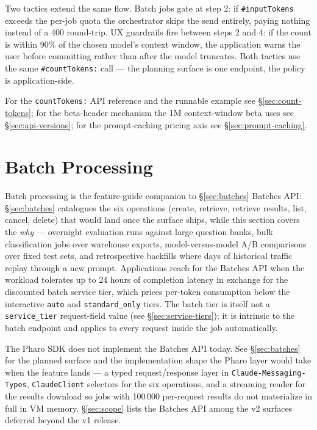\documentclass[a4paper,10pt,fleqn]{article}
\newcommand{\sel}[1]{\texttt{\##1}}
\begin{document}
Two tactics extend the same flow.  Batch jobs gate at step 2: if
\sel{inputTokens} exceeds the per-job quota the orchestrator skips
the send entirely, paying nothing instead of a 400 round-trip.  UX
guardrails fire between steps 2 and 4: if the count is within 90\%
of the chosen model's context window, the application warns the
user before committing rather than after the model truncates.  Both
tactics use the same \sel{countTokens:} call --- the planning surface
is one endpoint, the policy is application-side.

For the \texttt{countTokens:} API reference and the runnable
example see §\ref{sec:count-tokens}; for the beta-header mechanism
the 1M context-window beta uses see §\ref{sec:api-versions}; for
the prompt-caching pricing axis see §\ref{sec:prompt-caching}.

\medskip
\begin{sloppypar}
\end{sloppypar}

\section{Batch Processing}
\label{sec:batch-processing}

Batch processing is the feature-guide companion to §\ref{sec:batches}
Batches API: §\ref{sec:batches} catalogues the six operations
(create, retrieve, retrieve results, list, cancel, delete) that
would land once the surface ships, while this section covers the
\emph{why} --- overnight evaluation runs against large question
banks, bulk classification jobs over warehouse exports,
model-versus-model A/B comparisons over fixed test sets, and
retrospective backfills where days of historical traffic replay
through a new prompt.  Applications reach for the Batches API
when the workload tolerates up to 24 hours of completion latency
in exchange for the discounted batch service tier, which prices
per-token consumption below the interactive \texttt{auto} and
\texttt{standard\_only} tiers.  The batch tier is itself not a
\texttt{service\_tier} request-field value (see
§\ref{sec:service-tiers}); it is intrinsic to the batch endpoint
and applies to every request inside the job automatically.

The Pharo SDK does not implement the Batches API today.  See
§\ref{sec:batches} for the planned surface and the implementation
shape the Pharo layer would take when the feature lands --- a typed
request/response layer in \texttt{Claude-Messaging-Types},
\texttt{ClaudeClient} selectors for the six operations, and a
streaming reader for the results download so jobs with 100\,000
per-request results do not materialize in full in VM memory.
§\ref{sec:scope} lists the Batches API among the v2 surfaces
deferred beyond the v1 release.
\end{document}
